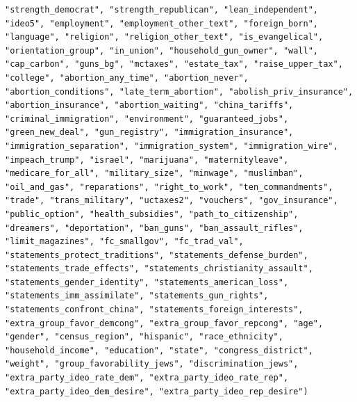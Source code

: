 \documentclass[
]{article}
\newenvironment{Shaded}{\begin{snugshade}}{\end{snugshade}}
\newcommand{\CommentTok}[1]{\textcolor[rgb]{0.56,0.35,0.01}{\textit{#1}}}
\newcommand{\DataTypeTok}[1]{\textcolor[rgb]{0.13,0.29,0.53}{#1}}
\newcommand{\DecValTok}[1]{\textcolor[rgb]{0.00,0.00,0.81}{#1}}
\newcommand{\KeywordTok}[1]{\textcolor[rgb]{0.13,0.29,0.53}{\textbf{#1}}}
\newcommand{\NormalTok}[1]{#1}
\newcommand{\OperatorTok}[1]{\textcolor[rgb]{0.81,0.36,0.00}{\textbf{#1}}}
\newcommand{\StringTok}[1]{\textcolor[rgb]{0.31,0.60,0.02}{#1}}
\begin{document}
\begin{verbatim}
"strength_democrat", "strength_republican", "lean_independent", "ideo5", "employment", "employment_other_text", "foreign_born", "language", "religion", "religion_other_text", "is_evangelical", "orientation_group", "in_union", "household_gun_owner", "wall", "cap_carbon", "guns_bg", "mctaxes", "estate_tax", "raise_upper_tax", "college", "abortion_any_time", "abortion_never", "abortion_conditions", "late_term_abortion", "abolish_priv_insurance", "abortion_insurance", "abortion_waiting", "china_tariffs", "criminal_immigration", "environment", "guaranteed_jobs", "green_new_deal", "gun_registry", "immigration_insurance", "immigration_separation", "immigration_system", "immigration_wire", "impeach_trump", "israel", "marijuana", "maternityleave", "medicare_for_all", "military_size", "minwage", "muslimban", "oil_and_gas", "reparations", "right_to_work", "ten_commandments", "trade", "trans_military", "uctaxes2", "vouchers", "gov_insurance", "public_option", "health_subsidies", "path_to_citizenship", "dreamers", "deportation", "ban_guns", "ban_assault_rifles", "limit_magazines", "fc_smallgov", "fc_trad_val", "statements_protect_traditions", "statements_defense_burden", "statements_trade_effects", "statements_christianity_assault", "statements_gender_identity", "statements_american_loss", "statements_imm_assimilate", "statements_gun_rights", "statements_confront_china", "statements_foreign_interests", "extra_group_favor_demcong", "extra_group_favor_repcong", "age", "gender", "census_region", "hispanic", "race_ethnicity", "household_income", "education", "state", "congress_district", "weight", "group_favorability_jews", "discrimination_jews", "extra_party_ideo_rate_dem", "extra_party_ideo_rate_rep", "extra_party_ideo_dem_desire", "extra_party_ideo_rep_desire")
\end{verbatim}

\begin{Shaded}
\end{Shaded}
\end{document}
